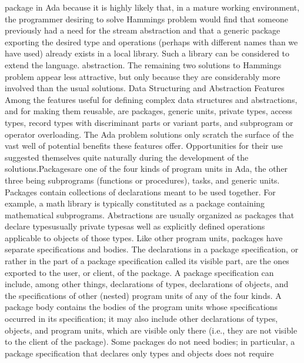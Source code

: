 package in Ada because it is highly likely that, in a mature working
environment, the programmer desiring to solve Hamming\rsquo[]s problem
would find that someone previously had a need for the stream abstraction
and that a generic package exporting the desired type and operations
(perhaps with different names than we have used) already exists in
a local library. Such a library can be considered to extend the language.%
\NtEndntpar[]\NtEndfoot[] abstraction. The remaining two solutions
to Hamming\rsquo[]s problem appear less attractive, but only because
they are considerably more involved than the usual solutions.%
\Endpara[]
\DivEndiv[]
\DivLiv[]\HdMinLiv[]Data Structuring and Abstraction Features%
\HdMinEndiv[]
\Para[]Among the features useful for defining complex data structures
and abstractions, and for making them reusable, are packages, generic
units, private types, access types, record types with discriminant
parts or variant parts, and subprogram or operator overloading. The
Ada problem solutions only scratch the surface of the vast well of
potential benefits these features offer. Opportunities for their use
suggested themselves quite naturally during the development of the
solutions.\Endpara[]
\Para[]\txtxemph[]Packages\txtxendemph[] are one of the four kinds
of program units in Ada, the other three being subprograms (functions
or procedures), tasks, and generic units. Packages contain collections
of declarations meant to be used together. For example, a math library
is typically constituted as a package containing mathematical subprograms.
Abstractions are usually organized as packages that declare types\EmDash[]usually
private types\EmDash[]as well as explicitly defined operations applicable
to objects of those types. Like other program units, packages have
separate specifications and bodies. The declarations in a package
specification, or rather in the part of a package specification called
its \txtxemph[]visible part\txtxendemph[], are the ones exported to
the user, or client, of the package. A package specification can include,
among other things, declarations of types, declarations of objects,
and the specifications of other (nested) program units of any of the
four kinds. A package body contains the bodies of the program units
whose specifications occurred in its specification; it may also include
other declarations of types, objects, and program units, which are
visible only there (i.e., they are not visible to the client of the
package). Some packages do not need bodies; in particular, a package
specification that declares only types and objects does not require
